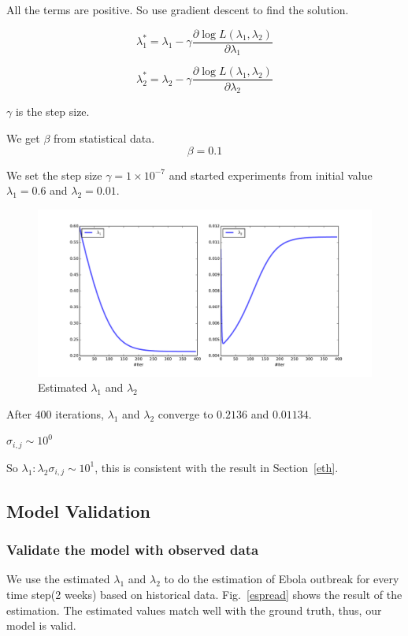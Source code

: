 \documentclass[11pt]{article}
\begin{document}
All the terms are positive. So use gradient descent to find the solution.

$$\lambda_1^* = \lambda_1 - \gamma \frac{\partial \log L(\lambda_1, \lambda_2)}{\partial \lambda_1}$$

$$\lambda_2^* = \lambda_2 - \gamma \frac{\partial \log L(\lambda_1, \lambda_2)}{\partial \lambda_2}$$

$\gamma$ is the step size.

We get $\beta$ from statistical data. $$\beta = 0.1$$ 

We set the step size $\gamma = 1\times 10^{-7}$ and started experiments from initial value $\lambda_1 = 0.6$ and $\lambda_2 = 0.01$.

\begin{figure}[hbt]
\begin{center}
  \includegraphics[width=6in]{graph/iter.pdf}
  \caption{Estimated $\lambda_1$ and $\lambda_2$}
  \label{est2}
\end{center}  
\end{figure}

After $400$ iterations, $\lambda_1$ and $\lambda_2$ converge to $0.2136$ and $0.01134$.

$\sigma_{i,j} \sim 10^0$

So $\lambda_1 : \lambda_2 \sigma_{i,j} \sim 10^1$, this is consistent with the result in Section~\ref{eth}.

\subsection{Model Validation}

\subsubsection{Validate the model with observed data}
We use the estimated $\lambda_1$ and $\lambda_2$ to do the estimation of Ebola outbreak for every time step(2 weeks) based on historical data. Fig.~\ref{espread} shows the result of the estimation. The estimated values match well with the ground truth, thus, our model is valid.
\end{document}
